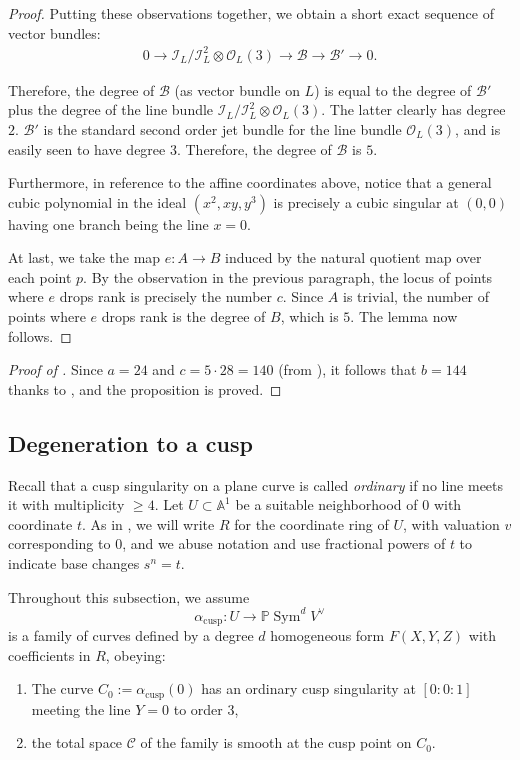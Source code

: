 \documentclass[12 pt, reqno]{amsart}
\theoremstyle{definition}
\newcommand{\on}{\operatorname}
\newcommand{\mb}{\mathbb}
\newcommand{\mc}{\mathcal}
\renewcommand{\P}{\mb{P}}
\begin{document}
\begin{proof}
Putting these observations together, we obtain a short exact sequence
of vector bundles:
\begin{align}
  0 \to \mc{I}_{L}/\mc{I}^{2}_{L} \otimes \mc{O}_{L}(3) \to \mathcal{B} \to \mathcal{B'} \to 0.
\end{align}

Therefore, the degree of $\mathcal{B}$ (as vector bundle on $L$) is
equal to the degree of $\mathcal{B}'$ plus the degree of the line
bundle $\mc{I}_{L}/\mc{I}^{2}_{L} \otimes \mc{O}_{L}(3)$.  The latter
clearly has degree $2$.  $\mathcal{B}'$ is the standard second order
jet bundle for the line bundle $\mc{O}_{L}(3)$, and is easily seen to
have degree $3$. Therefore, the degree of $\mathcal{B}$ is $5$.

Furthermore, in reference to the affine coordinates above, notice that
a general cubic polynomial in the ideal $(x^{2},xy,y^{3})$ is
precisely a cubic singular at $(0,0)$ having one branch being the line
$x=0$.

At last, we take the map $e: A \to B$ induced by the natural quotient
map over each point $p$.  By the observation in the previous
paragraph, the locus of points where $e$ drops rank is precisely the
number $c$.  Since $A$ is trivial, the number of points where $e$
drops rank is the degree of $B$, which is $5$.  The lemma now follows.
\end{proof}

\begin{proof}[Proof of ]
  Since $a=24$ and $c=5\cdot 28=140$ (from ), it follows
  that $b=144$ thanks to , and the proposition is proved.
\end{proof}



\subsection{Degeneration to a cusp}

Recall that a cusp singularity on a plane curve is called
\emph{ordinary} if no line meets it with multiplicity $\geq 4$. Let
$U \subset \mathbb{A}^{1}$ be a suitable neighborhood of $0$ with
coordinate $t$.  As in , we will write $R$ for
the coordinate ring of $U$, with valuation $v$ corresponding to $0$,
and we abuse notation and use fractional powers of $t$ to indicate
base changes $s^{n}=t$.

Throughout this subsection, we assume
\[\alpha_{\on{cusp}}: U \to \P \on{Sym}^{d}V^{\vee}\] is a family of curves
defined by a degree $d$ homogeneous form $F(X,Y,Z)$ with coefficients
in $R$, obeying:
\begin{enumerate}
\item The curve $C_{0} := \alpha_{\on{cusp}}(0)$ has an ordinary cusp
  singularity at $[0:0:1]$ meeting the line $Y=0$ to order $3$,
\item the total space $\mathcal{C}$ of the family is smooth at the
  cusp point on $C_{0}$.
\end{enumerate}
\end{document}
